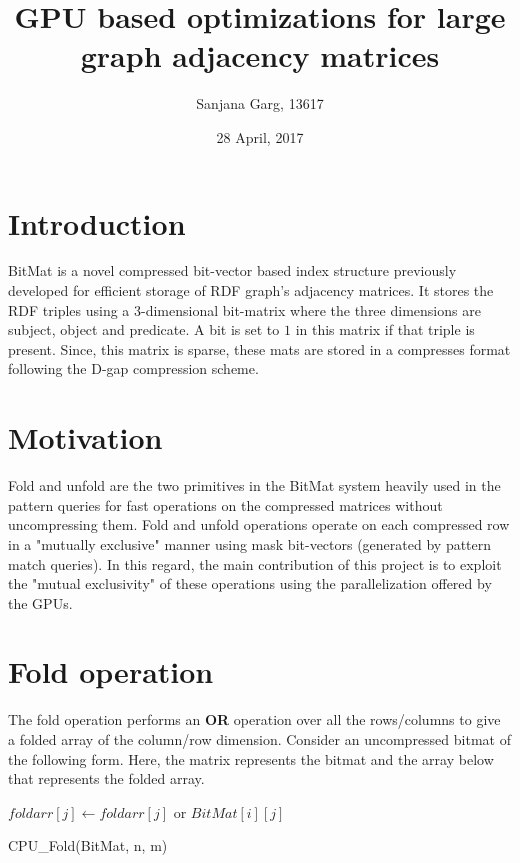 \documentclass{article}
\title{GPU based optimizations for large graph adjacency matrices}
\author{Sanjana Garg, 13617}
\date{28 April, 2017}
\begin{document}
\maketitle

\section*{Introduction}
BitMat is a novel compressed bit-vector based index structure previously developed for efficient storage of RDF graph's adjacency matrices. It stores the RDF triples using a 3-dimensional bit-matrix where the three dimensions are subject, object and predicate. A bit is set to $1$ in this matrix if that triple is present. Since, this matrix is sparse, these mats are stored in a compresses format following the D-gap compression scheme.\\

\section*{Motivation}
Fold and unfold are the two primitives in the BitMat system heavily used in the pattern queries for fast operations on the compressed matrices without uncompressing them. Fold and unfold operations operate on each compressed row in a "mutually exclusive" manner using mask bit-vectors (generated by pattern match queries). In this regard, the main contribution of this project is to exploit the "mutual exclusivity" of these operations using the parallelization offered by the GPUs. 

\section*{Fold operation}
The fold operation performs an \textbf{OR} operation over all the rows/columns to give a folded array of the column/row dimension.
Consider an uncompressed bitmat of the following form. Here, the matrix represents the bitmat and the array below that represents the folded array.

\begin{algorithm}[H]
      \begin{algorithmic}[1]
                \STATE $foldarr[j] \gets foldarr[j]$ or $BitMat[i][j]$
            \ENDFOR
        \ENDFOR
      \end{algorithmic}
      \caption{CPU\_Fold(BitMat, n, m)}
\end{algorithm}
\end{document}
